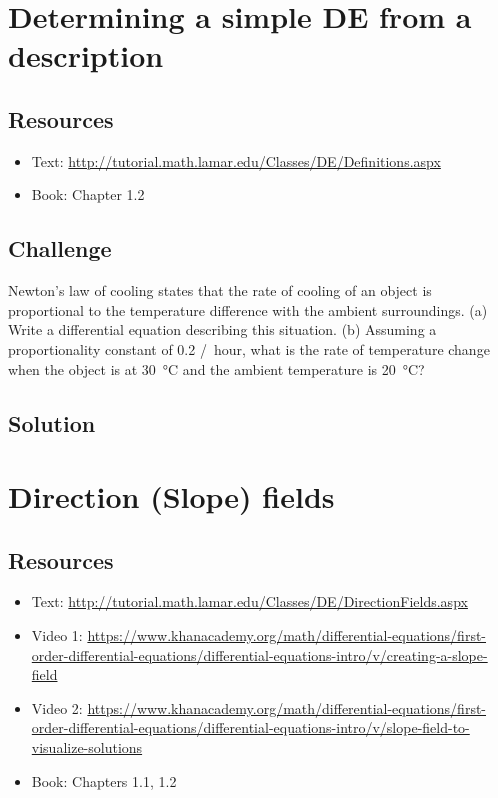 \section{Determining a simple DE from a description}

\subsection*{Resources}
\begin{itemize}
    \item Text: \url{http://tutorial.math.lamar.edu/Classes/DE/Definitions.aspx}
    \item Book: Chapter 1.2
\end{itemize}

\subsection*{Challenge}
Newton's law of cooling states that the rate of cooling of an object is proportional to the temperature difference with the ambient surroundings. (a) Write a differential equation describing this situation. (b) Assuming a proportionality constant of \num{0.2} \si{/hour}, what is the rate of temperature change when the object is at \SI{30}{\degreeCelsius} and the ambient temperature is \SI{20}{\degreeCelsius}?

\subsection*{Solution}


\timebox



\newpage
\section{Direction (Slope) fields}

\subsection*{Resources}
\begin{itemize}
    \item Text: \url{http://tutorial.math.lamar.edu/Classes/DE/DirectionFields.aspx}
    \item Video 1: \url{https://www.khanacademy.org/math/differential-equations/first-order-differential-equations/differential-equations-intro/v/creating-a-slope-field}
    \item Video 2: \url{https://www.khanacademy.org/math/differential-equations/first-order-differential-equations/differential-equations-intro/v/slope-field-to-visualize-solutions}
    \item Book: Chapters 1.1, 1.2
\end{itemize}

